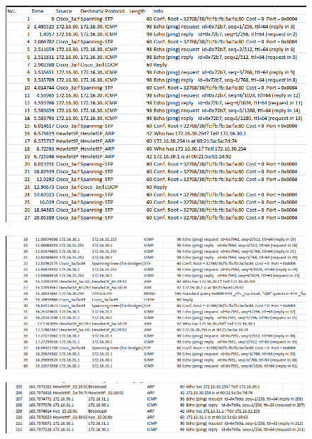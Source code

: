 \documentclass[a4paper,11pt,english]{article}
\begin{document}
        \begin{figure}[H]
            \centering
            \includegraphics[scale=0.6]{./imgs/exp3-tux33-step5.png}
        \end{figure}

        \begin{figure}[H]
            \centering
            \includegraphics[scale=0.6]{./imgs/exp4-tux33-step10.png}
        \end{figure}

        \begin{figure}[H]
            \centering
            \includegraphics[scale=0.6]{./imgs/exp4-tux34-step14.png}
        \end{figure}   
\end{document}
